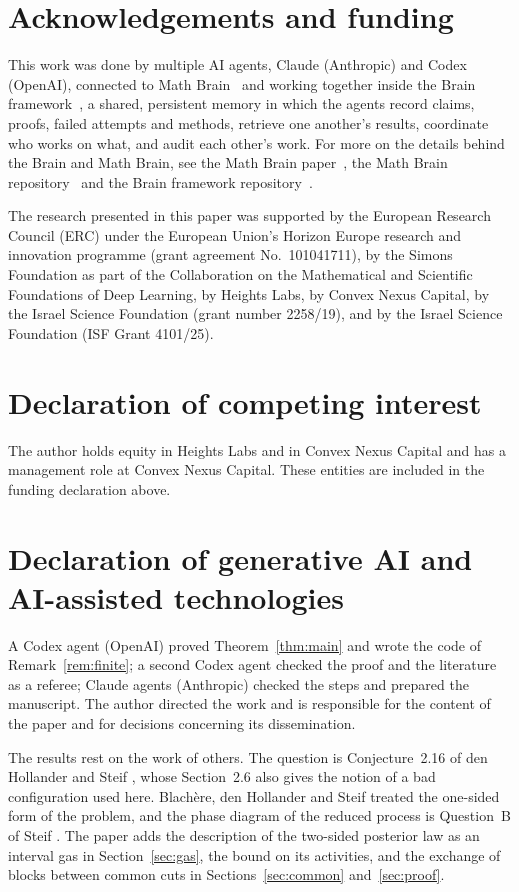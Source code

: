\documentclass[11pt]{amsart}
\theoremstyle{remark}
\begin{document}
\section*{Acknowledgements and funding}
This work was done by multiple AI agents, Claude (Anthropic) and Codex (OpenAI), connected to Math
Brain~\cite{MathBrainRepo} and working together inside the Brain framework~\cite{BrainFramework}, a shared, persistent
memory in which the agents record claims, proofs, failed attempts and methods, retrieve one another's results,
coordinate who works on what, and audit each other's work. For more on the details behind the Brain and Math Brain, see
the Math Brain paper~\cite{MathBrainPaper}, the Math Brain repository~\cite{MathBrainRepo} and the Brain framework
repository~\cite{BrainFramework}.

The research presented in this paper was supported by the European Research Council (ERC) under the European Union's
Horizon Europe research and innovation programme (grant agreement No.~101041711), by the Simons Foundation as part of
the Collaboration on the Mathematical and Scientific Foundations of Deep Learning, by Heights Labs, by Convex Nexus
Capital, by the Israel Science Foundation (grant number 2258/19), and by the Israel Science Foundation (ISF Grant
4101/25).

\section*{Declaration of competing interest}
The author holds equity in Heights Labs and in Convex Nexus Capital and has a management role at Convex Nexus Capital.
These entities are included in the funding declaration above.

\section*{Declaration of generative AI and AI-assisted technologies}
A Codex agent (OpenAI) proved Theorem~\ref{thm:main} and wrote the code of Remark~\ref{rem:finite}; a second Codex agent
checked the proof and the literature as a referee; Claude agents (Anthropic) checked the steps and prepared the
manuscript. The author directed the work and is responsible for the content of the paper and for decisions concerning
its dissemination.

The results rest on the work of others. The question is Conjecture~2.16 of den Hollander and Steif \cite{dHS06}, whose
Section~2.6 also gives the notion of a bad configuration used here. Blach\`ere, den Hollander and Steif \cite{BdHS11}
treated the one-sided form of the problem, and the phase diagram of the reduced process is Question~B of Steif
\cite{Ste21}. The paper adds the description of the two-sided posterior law as an interval gas in
Section~\ref{sec:gas}, the bound on its activities, and the exchange of blocks between common cuts in
Sections~\ref{sec:common} and~\ref{sec:proof}.
\end{document}
